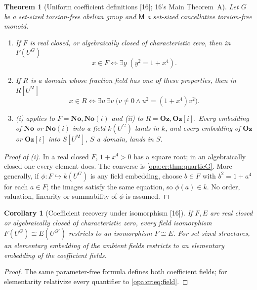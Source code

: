 \documentclass[11pt,oneside]{article}
\numberwithin{equation}{section}
\newtheorem{theorem}{Theorem}[section]
\newtheorem{corollary}[corollary]{Corollary}
\theoremstyle{definition}
\theoremstyle{remark}
\newcommand{\No}{\mathbf{No}}
\newcommand{\Oz}{\mathbf{Oz}}
\newcommand{\Og}{\mathbf{Oz}[i]}
\newcommand{\SC}{\mathbf{No}(i)}
\newcommand{\src}[1]{\textup{\textsf{\small[#1]}}}
\begin{document}
\begin{theorem}[Uniform coefficient definitions \src{16}; 16's Main Theorem~A]\label{opa:cr:thm:quartic}
Let $G$ be a set-sized torsion-free abelian group and $\mathsf M$ a set-sized cancellative torsion-free monoid.
\begin{enumerate}[label=\textup{(\roman*)},itemsep=1pt]
\item If $F$ is real closed, or algebraically closed of characteristic zero, then in $F(U^G)$
\begin{equation}\label{opa:cr:eq:field}
 x\in F\iff\exists y\;(y^2=1+x^4).
\end{equation}
\item If $R$ is a domain whose fraction field has one of these properties, then in $R[U^{\mathsf M}]$
\begin{equation}\label{opa:cr:eq:ring}
 x\in R\iff\exists u\,\exists v\;\bigl(v\ne0\wedge u^2=(1+x^4)v^2\bigr).
\end{equation}
\item (i) applies to $F=\No,\SC$ and (ii) to $R=\Oz,\Og$. Every embedding of $\No$ or $\SC$ into a field $k(U^G)$
lands in $k$, and every embedding of $\Oz$ or $\Og$ into $S[U^{\mathsf M}]$, $S$ a domain, lands in $S$.
\end{enumerate}
\end{theorem}
\begin{proof}[Proof of \textup{(i)}]
In a real closed $F$, $1+x^4>0$ has a square root; in an algebraically closed one every element does. The
converse is \cref{opa:cr:thm:quarticG}. More generally, if $\phi:F\hookrightarrow k(U^G)$ is any field embedding,
choose $b\in F$ with $b^2=1+a^4$ for each $a\in F$; the images satisfy the same equation, so $\phi(a)\in k$. No
order, valuation, linearity or summability of $\phi$ is assumed.
\end{proof}

\begin{corollary}[Coefficient recovery under isomorphism \src{16}]\label{opa:cr:cor:fieldrecover}
If $F,E$ are real closed or algebraically closed of characteristic zero, every field isomorphism
$F(U^G)\cong E(U^{G'})$ restricts to an isomorphism $F\cong E$. For set-sized structures, an elementary embedding
of the ambient fields restricts to an elementary embedding of the coefficient fields.
\end{corollary}
\begin{proof}
The same parameter-free formula defines both coefficient fields; for elementarity relativize every quantifier
to \eqref{opa:cr:eq:field}.
\end{proof}
\end{document}
